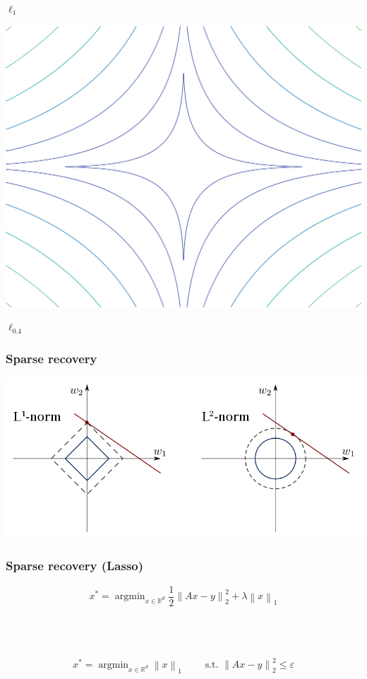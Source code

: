 \documentclass[aspectratio=169]{beamer}
\newcommand{\rd}{\mathbb{R}^d}
\newcommand{\norm}[1]{\left\|#1\right\|}
\newcommand{\normtwosq}[1]{\left\|#1\right\|_2^2}
\newcommand{\onehalf}{\frac{1}{2}}
\DeclareMathOperator*{\argmin}{argmin}
\begin{document}
\begin{frame}
\begin{center}
\begin{minipage}{.3\textwidth}
\begin{center}
		$\ell_1$
		\end{center}
		\end{minipage}\hfill
		\begin{minipage}{.3\textwidth}
		\begin{center}
		\includegraphics[width=\textwidth]{img/norm04}
		
		$\ell_{0.4}$
		\end{center}
		\end{minipage}

		\end{center}
		\end{frame}
		
		
		\begin{frame}
		\frametitle{Sparse recovery}
		\begin{center}
		\includegraphics[width=.8\textwidth]{img/l1l2}
		\end{center}
		\end{frame}

		\begin{frame}
		\frametitle{Sparse recovery (Lasso)}
		\begin{equation}
		\nonumber x^* = \argmin_{x\in \rd}\onehalf\normtwosq{Ax-y} + \lambda\norm{x}_1
		\end{equation}

		\quad \\ \quad \\ \quad \\
		\begin{equation}
		\nonumber
		x^* = \argmin_{x\in \rd}\norm{x}_1\qquad \text{ s.t. } \normtwosq{Ax-y}\le\varepsilon
		\end{equation}
		\end{frame}
		
\end{document}
